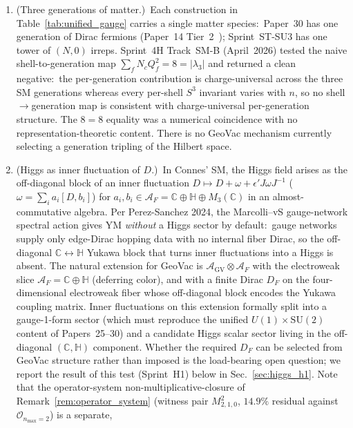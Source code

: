 \documentclass[11pt]{article}
\begin{document}
\begin{enumerate}\setlength{\itemsep}{2pt}
\item[\textbf{G1}] (Three generations of matter.)\ Each
construction in Table~\ref{tab:unified_gauge} carries a single
matter species:\ Paper~30 has one generation of Dirac fermions
(Paper~14 Tier~2~\cite{paper14}); Sprint~ST-SU3 has one tower of
$(N, 0)$ irreps.  Sprint~4H Track~SM-B (April~2026) tested the naive
shell-to-generation map $\sum_f N_c Q_f^2 = 8 = |\lambda_3|$ and
returned a clean negative:\ the per-generation contribution is
charge-universal across the three SM generations whereas every
per-shell $S^3$ invariant varies with $n$, so no shell$\to$generation
map is consistent with charge-universal per-generation structure.
The $8 = 8$ equality was a numerical coincidence with no
representation-theoretic content.  There is no GeoVac mechanism
currently selecting a generation tripling of the Hilbert space.
\item[\textbf{G2}] (Higgs as inner fluctuation of $D$.)\ In
Connes' SM, the Higgs field arises as the off-diagonal block of an
inner fluctuation $D \mapsto D + \omega + \epsilon' J \omega
J^{-1}$ ($\omega = \sum_i a_i [D, b_i]$) for $a_i, b_i \in
\mathcal{A}_F = \mathbb{C} \oplus \mathbb{H} \oplus M_3(\mathbb{C})$
in an almost-commutative algebra.  Per Perez-Sanchez 2024, the
Marcolli--vS gauge-network spectral action gives YM \emph{without}
a Higgs sector by default:\ gauge networks supply only edge-Dirac
hopping data with no internal fiber Dirac, so the off-diagonal
$\mathbb{C} \leftrightarrow \mathbb{H}$ Yukawa block that turns
inner fluctuations into a Higgs is absent.  The natural extension
for GeoVac is $\mathcal{A}_{\mathrm{GV}} \otimes \mathcal{A}_F$
with the electroweak slice $\mathcal{A}_F = \mathbb{C} \oplus
\mathbb{H}$ (deferring color), and with a finite Dirac
$D_F$ on the four-dimensional electroweak fiber whose off-diagonal
block encodes the Yukawa coupling matrix.  Inner fluctuations on
this extension formally split into a gauge-1-form sector (which
must reproduce the unified $U(1) \times \mathrm{SU}(2)$ content of
Papers~25--30) and a candidate Higgs scalar sector living in the
off-diagonal $(\mathbb{C}, \mathbb{H})$ component.  Whether the
required $D_F$ can be selected from GeoVac structure rather than
imposed is the load-bearing open question; we report the result of
this test (Sprint~H1) below in Sec.~\ref{sec:higgs_h1}.  Note that
the operator-system non-multiplicative-closure of
Remark~\ref{rem:operator_system} (witness pair $M_{2,1,0}^2$,
$14.9\%$ residual against $\mathcal{O}_{n_{\max}=2}$) is a separate,

\end{enumerate}
\end{document}
